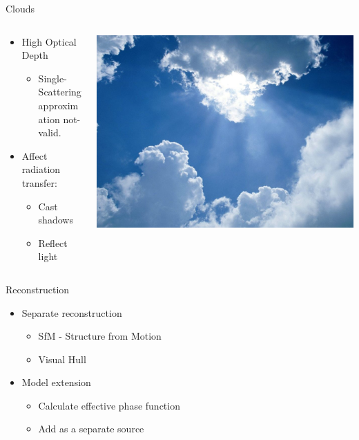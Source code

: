 \documentclass[compress,red,12pt]{beamer}
\begin{document}
\begin{frame}{Clouds}
  \begin{columns}[T]
    \begin{column}{.6\textwidth}
      \begin{itemize}
      \item High Optical Depth
        \begin{itemize}
        \item Single-Scattering approximation not-valid.
        \end{itemize}
      \item Affect radiation transfer:
        \begin{itemize}
        \item Cast shadows
        \item Reflect light
        \end{itemize}
      \end{itemize}
    \end{column}
    \begin{column}{.4\textwidth}
      \includegraphics[height=0.40\textheight]{clouds.jpg}
    \end{column}
  \end{columns}
\end{frame}


\begin{frame}{Reconstruction}

  \begin{itemize}
  \item Separate reconstruction
    \begin{itemize}
    \item SfM - Structure from Motion 
    \item Visual Hull
    \end{itemize}

  \item Model extension
    \begin{itemize}
    \item Calculate effective phase function
    \item Add as a separate source
    \end{itemize}
  \end{itemize}

\end{frame}
\end{document}
